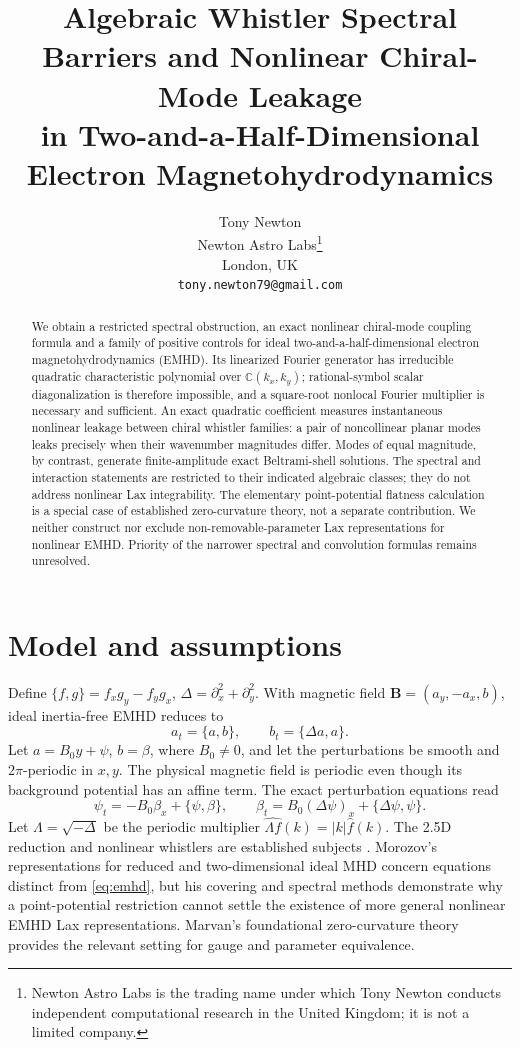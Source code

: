 \documentclass[11pt,a4paper]{article}
\title{\textbf{Algebraic Whistler Spectral Barriers and Nonlinear Chiral-Mode Leakage}\\in Two-and-a-Half-Dimensional Electron Magnetohydrodynamics}
\author{Tony Newton\\Newton Astro Labs\thanks{Newton Astro Labs is the trading name under which Tony Newton conducts independent computational research in the United Kingdom; it is not a limited company.}\\London, UK\\\texttt{tony.newton79@gmail.com}}
\date{}
\begin{document}
\maketitle
\begin{abstract}
We obtain a restricted spectral obstruction, an exact nonlinear chiral-mode coupling formula and a family of positive controls for ideal two-and-a-half-dimensional electron magnetohydrodynamics (EMHD). Its linearized Fourier generator has irreducible quadratic characteristic polynomial over \(\mathbb C(k_x,k_y)\); rational-symbol scalar diagonalization is therefore impossible, and a square-root nonlocal Fourier multiplier is necessary and sufficient. An exact quadratic coefficient measures instantaneous nonlinear leakage between chiral whistler families: a pair of noncollinear planar modes leaks precisely when their wavenumber magnitudes differ. Modes of equal magnitude, by contrast, generate finite-amplitude exact Beltrami-shell solutions. The spectral and interaction statements are restricted to their indicated algebraic classes; they do not address nonlinear Lax integrability. The elementary point-potential flatness calculation is a special case of established zero-curvature theory, not a separate contribution. We neither construct nor exclude non-removable-parameter Lax representations for nonlinear EMHD. Priority of the narrower spectral and convolution formulas remains unresolved.
\end{abstract}

\section{Model and assumptions}
Define \(\{f,g\}=f_xg_y-f_yg_x\), \(\Delta=\partial_x^2+\partial_y^2\).
With magnetic field \(\mathbf B=(a_y,-a_x,b)\), ideal inertia-free EMHD reduces to
\begin{equation}\label{eq:emhd}
 a_t=\{a,b\},\qquad b_t=\{\Delta a,a\}.
\end{equation}
Let \(a=B_0y+\psi\), \(b=\beta\), where \(B_0\ne0\), and let the perturbations be smooth and \(2\pi\)-periodic in \(x,y\). The physical magnetic field is periodic even though its background potential has an affine term. The exact perturbation equations read
\begin{equation}\label{eq:pert}
 \psi_t=-B_0\beta_x+\{\psi,\beta\},\qquad
 \beta_t=B_0(\Delta\psi)_x+\{\Delta\psi,\psi\}.
\end{equation}
Let \(\Lambda=\sqrt{-\Delta}\) be the periodic multiplier \(\widehat{\Lambda f}(k)=|k|\widehat f(k)\).
The 2.5D reduction and nonlinear whistlers are established subjects
\cite{peng,lyutikov,shaikh}. Morozov's representations for reduced and two-dimensional ideal MHD
\cite{morozov} concern equations distinct from \eqref{eq:emhd}, but his
covering and spectral methods demonstrate why a point-potential restriction
cannot settle the existence of more general nonlinear EMHD Lax representations.
Marvan's foundational zero-curvature theory \cite{marvan1993,marvan2002}
provides the relevant setting for gauge and parameter equivalence.
\end{document}
